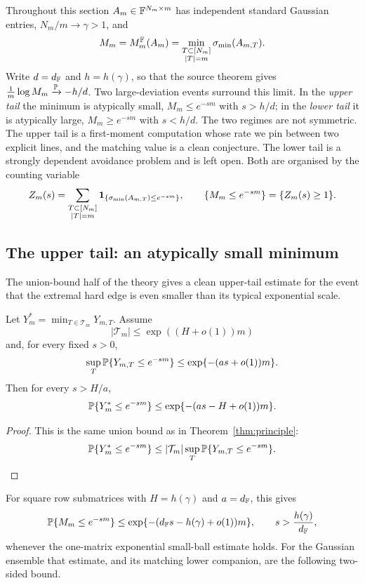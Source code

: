Throughout this section \(A_m\in\mathbb{F}^{N_m\times m}\) has independent standard
Gaussian entries, \(N_m/m\to\gamma>1\), and
\[
  M_m=M_m^{\mathbb{F}}(A_m)=\min_{\substack{T\subset[N_m]\\ |T|=m}}\sigma_{\min}(A_{m,T}).
\]
Write \(d=d_{\mathbb{F}}\) and \(h=h(\gamma)\), so that the source theorem gives
\(\tfrac1m\log M_m\xrightarrow{\mathbb{P}}-h/d\).  Two large-deviation events surround
this limit.  In the \emph{upper tail} the minimum is atypically small,
\(M_m\le e^{-sm}\) with \(s>h/d\); in the \emph{lower tail} it is atypically
large, \(M_m\ge e^{-sm}\) with \(s<h/d\).  The two regimes are not symmetric.  The
upper tail is a first-moment computation whose rate we pin between two explicit
lines, and the matching value is a clean conjecture.  The lower tail is a strongly
dependent avoidance problem and is left open.  Both are organised by the counting
variable
\begin{equation}\label{ldp:Zdef}
  Z_m(s)=\sum_{\substack{T\subset[N_m]\\ |T|=m}}
         \mathbf{1}_{\{\sigma_{\min}(A_{m,T})\le e^{-sm}\}},
  \qquad
  \{M_m\le e^{-sm}\}=\{Z_m(s)\ge1\}.
\end{equation}

\subsection{The upper tail: an atypically small minimum}

The union-bound half of the theory gives a clean upper-tail estimate for the
event that the extremal hard edge is even smaller than its typical exponential
scale.

\begin{proposition}\label{prop:small-tail}
Let \(Y_m^*=\min_{T\in\mathcal T_m}Y_{m,T}\).  Assume
\[
  |\mathcal T_m|\le \exp((H+o(1))m)
\]
and, for every fixed \(s>0\),
\[
  \sup_T\mathbb{P}\{Y_{m,T}\le e^{-sm}\}
  \le \exp\{-(as+o(1))m\}.
\]
Then for every \(s>H/a\),
\[
  \mathbb{P}\{Y_m^*\le e^{-sm}\}
  \le \exp\{-(as-H+o(1))m\}.
\]
\end{proposition}

\begin{proof}
This is the same union bound as in Theorem~\ref{thm:principle}:
\[
  \mathbb{P}\{Y_m^*\le e^{-sm}\}
  \le |\mathcal T_m|\sup_T\mathbb{P}\{Y_{m,T}\le e^{-sm}\}.
\]
\end{proof}

For square row submatrices with \(H=h(\gamma)\) and \(a=d_{\mathbb{F}}\), this gives
\begin{equation}\label{ldp:gauss-upper}
  \mathbb{P}\{M_m\le e^{-sm}\}
  \le
  \exp\{-(d_{\mathbb{F}} s-h(\gamma)+o(1))m\},
  \qquad s>\frac{h(\gamma)}{d_{\mathbb{F}}},
\end{equation}
whenever the one-matrix exponential small-ball estimate holds.  For the Gaussian
ensemble that estimate, and its matching lower companion, are the following
two-sided bound.

